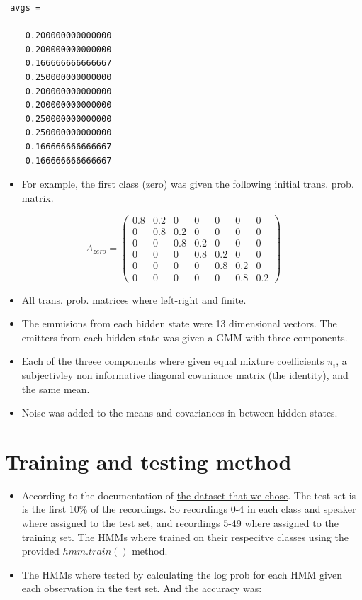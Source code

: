 \documentclass[]{article}
\providecommand{\tightlist}{%
  \setlength{\itemsep}{0pt}\setlength{\parskip}{0pt}}
\begin{document}
\begin{verbatim}
 avgs =
 
    0.200000000000000
    0.200000000000000
    0.166666666666667
    0.250000000000000
    0.200000000000000
    0.200000000000000
    0.250000000000000
    0.250000000000000
    0.166666666666667
    0.166666666666667
\end{verbatim}

\begin{itemize}
\tightlist
\item
  For example, the first class (zero) was given the following initial
  trans. prob. matrix.
\end{itemize}

\[A_{zero} = \begin{pmatrix}0.8 & 0.2 & 0 & 0 & 0 & 0 & 0\\ 0 & 0.8 & 0.2 & 0 & 0 & 0 & 0 \\ 0 & 0 & 0.8 & 0.2 & 0 & 0  & 0\\ 0 & 0 & 0 & 0.8 & 0.2 & 0 & 0\\ 0 & 0 & 0 & 0 & 0.8 & 0.2 & 0\\0 & 0 & 0 & 0 & 0 & 0.8 & 0.2\end{pmatrix}\]

\begin{itemize}
\item
  All trans. prob. matrices where left-right and finite.
\item
  The emmisions from each hidden state were 13 dimensional vectors. The
  emitters from each hidden state was given a GMM with three components.
\item
  Each of the threee components where given equal mixture coefficients
  \(\pi_i\), a subjectivley non informative diagonal covariance matrix
  (the identity), and the same mean.
\item
  Noise was added to the means and covariances in between hidden states.
\end{itemize}

\hypertarget{training-and-testing-method}{%
\section{Training and testing
method}\label{training-and-testing-method}}

\begin{itemize}
\item
  According to the documentation of
  \href{https://github.com/Jakobovski/free-spoken-digit-dataset}{the
  dataset that we chose}. The test set is is the first 10\% of the
  recordings. So recordings 0-4 in each class and speaker where assigned
  to the test set, and recordings 5-49 where assigned to the training
  set. The HMMs where trained on their respecitve classes using the
  provided \(hmm.train()\) method.
\item
  The HMMs where tested by calculating the log prob for each HMM given
  each observation in the test set. And the accuracy was:
\end{itemize}
\end{document}
